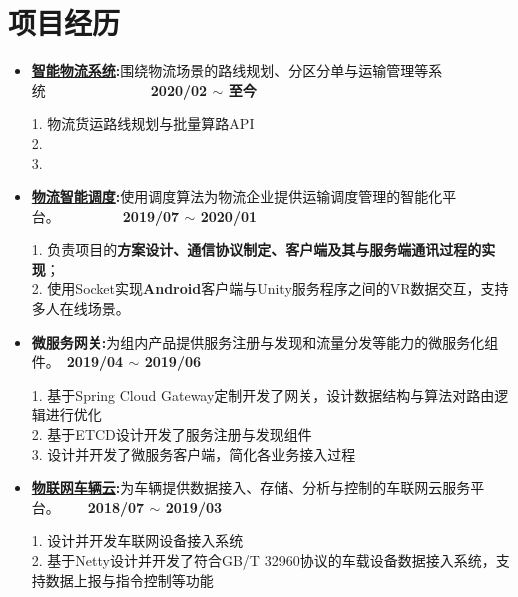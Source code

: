 \documentclass[letterpaper, UTF8, 11pt]{article}
\begin{document}
	\section*{\textbf{项目经历}}\vspace{-0.12in}
	\begin{itemize}	
		\item \textbf{\href{https://lbsyun.baidu.com/solutions/scheduling}{智能物流系统}:}{围绕物流场景的路线规划、分区分单与运输管理等系统}~~~~~~~~~~~~~~~\textbf{2020/02 $\sim$ 至今}
		
		1. 物流货运路线规划与批量算路API\\
		2. \\
		3. 
		
		\vspace{0.03in}

		\item \textbf{\href{https://lbsyun.baidu.com/solutions/scheduling}{物流智能调度}:}{使用调度算法为物流企业提供运输调度管理的智能化平台。}~~~~~~~~~\textbf{2019/07 $\sim$ 2020/01}
		
		1. 负责项目的\textbf{方案设计、通信协议制定、客户端及其与服务端通讯过程的实现}；\\
		2. 使用Socket实现\textbf{Android}客户端与Unity服务程序之间的VR数据交互，支持多人在线场景。
		
		\vspace{0.03in}

		\item \textbf{微服务网关:}{为组内产品提供服务注册与发现和流量分发等能力的微服务化组件。}~\textbf{2019/04 $\sim$ 2019/06}
		
		1. 基于Spring Cloud Gateway定制开发了网关，设计数据结构与算法对路由逻辑进行优化\\
		2. 基于ETCD设计开发了服务注册与发现组件\\
		3. 设计并开发了微服务客户端，简化各业务接入过程
		
		\vspace{0.03in}
		
		\item \textbf{\href{https://cloud.baidu.com/product/dugo.html}{物联网车辆云}:}{为车辆提供数据接入、存储、分析与控制的车联网云服务平台。}~~~~\textbf{2018/07 $\sim$ 2019/03}
		
		1. 设计并开发车联网设备接入系统\\
		2. 基于Netty设计并开发了符合GB/T 32960协议的车载设备数据接入系统，支持数据上报与指令控制等功能
		
		\vspace{0.03in}
		
	\end{itemize}
	\vspace{-0.32in}
\end{document}
